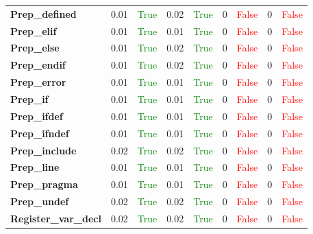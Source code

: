 \documentclass{article}
\begin{document}
\begin{xltabular}{\textwidth}{lcccccccc}
\textbf{{\fontsize{10}{12}\selectfont Prep\_defined}}& 0.01&\textcolor{green}{True}& 0.02&\textcolor{green}{True}& 0&\textcolor{red}{False}& 0&\textcolor{red}{False} \\[0.5ex]
\textbf{{\fontsize{10}{12}\selectfont Prep\_elif}}& 0.01&\textcolor{green}{True}& 0.01&\textcolor{green}{True}& 0&\textcolor{red}{False}& 0&\textcolor{red}{False} \\[0.5ex]
\textbf{{\fontsize{10}{12}\selectfont Prep\_else}}& 0.01&\textcolor{green}{True}& 0.02&\textcolor{green}{True}& 0&\textcolor{red}{False}& 0&\textcolor{red}{False} \\[0.5ex]
\textbf{{\fontsize{10}{12}\selectfont Prep\_endif}}& 0.01&\textcolor{green}{True}& 0.02&\textcolor{green}{True}& 0&\textcolor{red}{False}& 0&\textcolor{red}{False} \\[0.5ex]
\textbf{{\fontsize{10}{12}\selectfont Prep\_error}}& 0.01&\textcolor{green}{True}& 0.01&\textcolor{green}{True}& 0&\textcolor{red}{False}& 0&\textcolor{red}{False} \\[0.5ex]
\textbf{{\fontsize{10}{12}\selectfont Prep\_if}}& 0.01&\textcolor{green}{True}& 0.01&\textcolor{green}{True}& 0&\textcolor{red}{False}& 0&\textcolor{red}{False} \\[0.5ex]
\textbf{{\fontsize{10}{12}\selectfont Prep\_ifdef}}& 0.01&\textcolor{green}{True}& 0.01&\textcolor{green}{True}& 0&\textcolor{red}{False}& 0&\textcolor{red}{False} \\[0.5ex]
\textbf{{\fontsize{10}{12}\selectfont Prep\_ifndef}}& 0.01&\textcolor{green}{True}& 0.01&\textcolor{green}{True}& 0&\textcolor{red}{False}& 0&\textcolor{red}{False} \\[0.5ex]
\textbf{{\fontsize{10}{12}\selectfont Prep\_include}}& 0.02&\textcolor{green}{True}& 0.02&\textcolor{green}{True}& 0&\textcolor{red}{False}& 0&\textcolor{red}{False} \\[0.5ex]
\textbf{{\fontsize{10}{12}\selectfont Prep\_line}}& 0.01&\textcolor{green}{True}& 0.01&\textcolor{green}{True}& 0&\textcolor{red}{False}& 0&\textcolor{red}{False} \\[0.5ex]
\textbf{{\fontsize{10}{12}\selectfont Prep\_pragma}}& 0.01&\textcolor{green}{True}& 0.01&\textcolor{green}{True}& 0&\textcolor{red}{False}& 0&\textcolor{red}{False} \\[0.5ex]
\textbf{{\fontsize{10}{12}\selectfont Prep\_undef}}& 0.02&\textcolor{green}{True}& 0.02&\textcolor{green}{True}& 0&\textcolor{red}{False}& 0&\textcolor{red}{False} \\[0.5ex]
\textbf{{\fontsize{10}{12}\selectfont Register\_var\_decl}}& 0.02&\textcolor{green}{True}& 0.02&\textcolor{green}{True}& 0&\textcolor{red}{False}& 0&\textcolor{red}{False} \\[0.5ex]

\end{xltabular}
\end{document}
